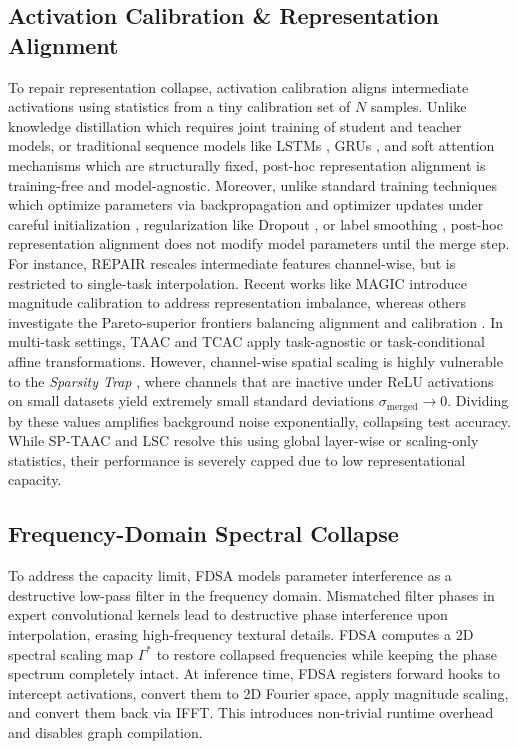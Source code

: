 \documentclass{article}
\theoremstyle{plain}
\theoremstyle{definition}
\theoremstyle{remark}
\begin{document}
\subsection{Activation Calibration \& Representation Alignment}
To repair representation collapse, activation calibration aligns intermediate activations using statistics from a tiny calibration set of $N$ samples. Unlike knowledge distillation \cite{hinton2015distilling} which requires joint training of student and teacher models, or traditional sequence models like LSTMs \cite{hochreiter1997lstm}, GRUs \cite{cho2014gru}, and soft attention mechanisms \cite{sutskever2014sequence, bahdanau2014nmt} which are structurally fixed, post-hoc representation alignment is training-free and model-agnostic. Moreover, unlike standard training techniques which optimize parameters via backpropagation \cite{rumelhart1986backprop} and optimizer updates \cite{kingma2014adam} under careful initialization \cite{glorot2010understanding, he2015delving}, regularization like Dropout \cite{srivastava2014dropout}, or label smoothing \cite{szegedy2016rethinking}, post-hoc representation alignment does not modify model parameters until the merge step. For instance, REPAIR \cite{jordan2022repair} rescales intermediate features channel-wise, but is restricted to single-task interpolation. Recent works like MAGIC \cite{li2025magic} introduce magnitude calibration to address representation imbalance, whereas others investigate the Pareto-superior frontiers balancing alignment and calibration \cite{hu2025navigating}. In multi-task settings, TAAC \cite{anonymous2026taac} and TCAC \cite{anonymous2026tcac} apply task-agnostic or task-conditional affine transformations. However, channel-wise spatial scaling is highly vulnerable to the \textit{Sparsity Trap} \cite{agent2026sptaac}, where channels that are inactive under ReLU activations on small datasets yield extremely small standard deviations $\sigma_{\text{merged}} \to 0$. Dividing by these values amplifies background noise exponentially, collapsing test accuracy. While SP-TAAC \cite{agent2026sptaac} and LSC \cite{anonymous2026lsc} resolve this using global layer-wise or scaling-only statistics, their performance is severely capped due to low representational capacity.

\subsection{Frequency-Domain Spectral Collapse}
To address the capacity limit, FDSA \cite{anonymous2026lsc} models parameter interference as a destructive low-pass filter in the frequency domain. Mismatched filter phases in expert convolutional kernels lead to destructive phase interference upon interpolation, erasing high-frequency textural details. FDSA computes a 2D spectral scaling map $\Gamma^*$ to restore collapsed frequencies while keeping the phase spectrum completely intact. At inference time, FDSA registers forward hooks to intercept activations, convert them to 2D Fourier space, apply magnitude scaling, and convert them back via IFFT. This introduces non-trivial runtime overhead and disables graph compilation.
\end{document}
